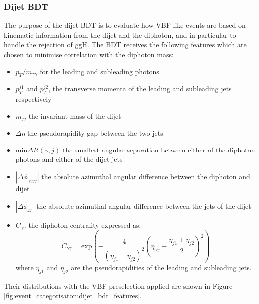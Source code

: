 \subsubsection{Dijet BDT}
The purpose of the dijet BDT is to evaluate how VBF-like events are based on kinematic information from the dijet and the diphoton, and in particular to handle the rejection of ggH.
The BDT receives the following features which are chosen to minimise correlation with the diphoton mass:
\begin{itemize}[leftmargin=.5in,noitemsep]
    \item $p_{T}/m_{\gamma\gamma}$ for the leading and subleading photons
    \item $p_{T}^{j1}$ and $p_{T}^{j2}$, the transverse momenta of the leading and subleading jets respectively
    \item $m_{jj}$ the invariant mass of the dijet
    \item $\Delta\eta$ the pseudorapidity gap between the two jets
    \item $\mathrm{min}\Delta{R}(\gamma,j)$ the smallest angular separation between either of the diphoton photons and either of the dijet jets
    \item $|\Delta\phi_{\gamma\gamma{jj}}|$ the absolute azimuthal angular difference between the diphoton and dijet
    \item $|\Delta\phi_{jj}|$ the absolute azimuthal angular difference between the jets of the dijet
    \item $C_{\gamma\gamma}$ the diphoton centrality expressed as:
        \begin{equation}
            C_{\gamma\gamma} = \mathrm{exp}\left(-\frac{4}{(\eta_{j1} - \eta_{j2})^{2}}\left( \eta_{\gamma\gamma} - \frac{\eta_{j1} + \eta_{j2}}{2} \right)^{2}\right)
        \end{equation}
        where $\eta_{j1}$ and $\eta_{j2}$ are the pseudorapidities of the leading and subleading jets.
\end{itemize}
Their distributions with the VBF preselection applied are shown in Figure \ref{fig:event_categorisaton:dijet_bdt_features}.
\newpage
